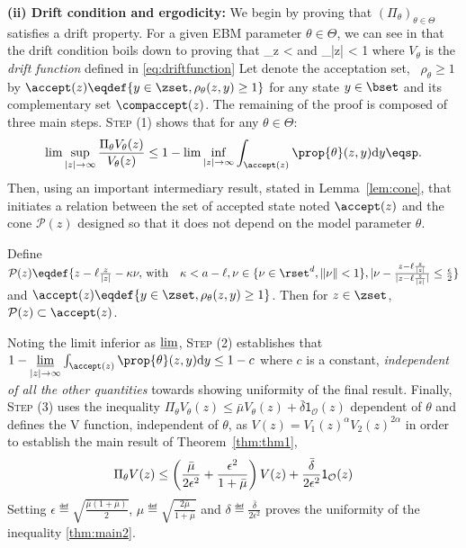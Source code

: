 \documentclass[10pt,twocolumn,letterpaper]{article}
\begin{document}
\medskip
\noindent \textbf{(ii) Drift condition and ergodicity: }
We begin by proving that $(\Pi_\theta)_{\theta \in \Theta}$ satisfies a drift property.
For a given EBM parameter $\theta \in \Theta$, we can see in \cite{jarner2000geometric} that the drift condition boils down to proving that
\beq\notag
\sup \limits_{z \in \zset}   < \infty \quad \textrm{and} \quad \lim \sup \limits_{|z| \to \infty}   < 1
\eeq
where $V_\theta$ is the \emph{drift function} defined in \eqref{eq:driftfunction}
Let denote the acceptation set, \ie\ $\rho_\theta \geq 1$ by $\accept(z) \eqdef \{ y \in \zset, \rho_\theta(z,y) \geq 1 \}$ for any state $y \in \bset$ and its complementary set $\compaccept(z)$.
The remaining of the proof is composed of three main steps. \textsc{Step (1)} shows that for any $\theta \in \Theta$:
\begin{align}\notag
\lim \sup \limits_{|z| \to \infty}  \frac{\Pi_\theta V_\theta(z)}{V_\theta(z)} \leq 1 - \lim \inf \limits_{|z| \to \infty}  \int_{\accept(z)} \prop{\theta}(z,y)  \textrm{d}y \eqsp.
\end{align}
Then, using an important intermediary result, stated in Lemma~\ref{lem:cone}, that initiates a relation between the set of accepted state noted $\accept(z)$ and the cone $\mathcal{P}(z)$ designed so that it does not depend on the model parameter $\theta$. 
\begin{lemm}\label{lem:cone}
Define $\mathcal{P}(z) \eqdef \{ z- \ell \frac{z}{|z|} - \kappa \nu , \, \textrm{with} \quad \kappa < a - \ell  , \nu \in \{ \nu \in \rset^d, \| \nu \| < 1\}, |\nu - \frac{z- \ell \frac{z}{|z|} }{|z- \ell \frac{z}{|z|} |} \leq \frac{\epsilon}{2}   \}$ and $\accept(z) \eqdef \{ y \in \zset, \rho_\theta(z,y) \geq 1 \}$. Then for $z \in \zset$, $\mathcal{P}(z) \subset \accept(z)$.
\end{lemm}
Noting the limit inferior as $\varliminf$, \textsc{Step (2)} establishes that $1 - \varliminf \limits_{|z| \to \infty}  \int_{\accept(z)} \prop{\theta}(z,y)  \textrm{d}y \leq 1 - c$ where $c$ is a constant, \emph{independent of all the other quantities} towards showing uniformity of the final result.
Finally, \textsc{Step (3)} uses the inequality $\Pi_\theta V_\theta(z) \leq \bar{\mu} V_\theta(z) + \bar{\delta} \mathsf{1}_{\mathcal{O}}(z)$ dependent of $\theta$ and defines the V function, independent of $\theta$, as $V(z) = V_1(z)^\alpha V_2(z)^{2\alpha}$ in order to establish the main result of Theorem~\ref{thm:thm1}, \ie
\begin{align}\notag
\Pi_\theta V(z) \leq \left(\frac{\bar{\mu}}{2 \epsilon^2} + \frac{\epsilon^2}{1 + \bar{\mu}} \right) V(z) +\frac{\bar{\delta}}{2 \epsilon^2} \mathsf{1}_{\mathcal{O}}(z) 
\end{align}
Setting $\epsilon \eqdef \sqrt{\frac{\bar{\mu}(1+\bar{\mu})}{2}}$, $ \mu  \eqdef  \sqrt{\frac{2\bar{\mu}}{1+\bar{\mu}}}$ and $\delta \eqdef \frac{\bar{\delta}}{2 \epsilon^2}$ proves the uniformity of the inequality \eqref{thm:main2}.
\end{document}
